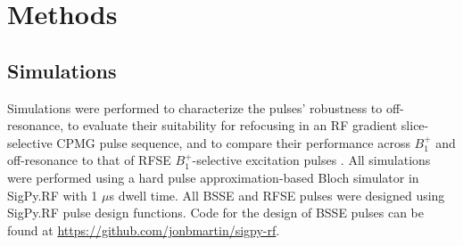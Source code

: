 \documentclass{article}
\begin{document}
\section{Methods}
\subsection{Simulations}
Simulations were performed to characterize the pulses' robustness to off-resonance, 
to evaluate their suitability for refocusing in an RF gradient slice-selective CPMG pulse sequence, 
and to compare their performance across $B_1^+$ and off-resonance to that of RFSE $B_1^+$-selective excitation pulses \cite{Grissom2014B1+-selectiveAlgorithm}. 
All simulations were performed using a hard pulse approximation-based Bloch simulator \cite{Pauly1991ParameterAlgorithm} in SigPy.RF \cite{Martin2020SigPy.RF:Research} with 1 $\mu$s dwell time. All BSSE and RFSE pulses were designed using SigPy.RF pulse design functions. Code for the design of BSSE pulses can be found at \url{https://github.com/jonbmartin/sigpy-rf}.
\end{document}
